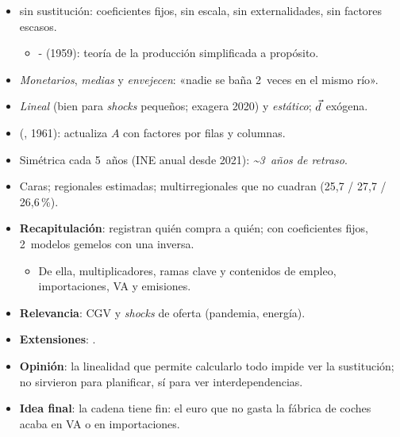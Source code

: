 \documentclass{article}
\begin{document}
\begin{columnas}
\begin{itemize}
\item {} sin sustitución: coeficientes fijos, sin escala, sin externalidades, sin factores escasos.
  \begin{itemize}
  \item {}- (1959): teoría de la producción simplificada a propósito.
  \end{itemize}
\end{itemize}
\begin{itemize}
\item \emph{Monetarios}, \emph{medias} y \emph{envejecen}: «nadie se baña 2~veces en el mismo río».
\item \emph{Lineal} (bien para \emph{shocks} pequeños; exagera 2020) y \emph{estático}; $\vec{d}$ exógena.
\item {} (, 1961): actualiza $A$ con factores por filas y columnas.
\end{itemize}
\begin{itemize}
\item Simétrica cada 5~años (INE anual desde 2021): \emph{\textasciitilde 3~años de retraso}.
\item Caras; regionales estimadas; multirregionales que no cuadran (25,7 / 27,7 / 26,6\,\%).
\end{itemize}

\begin{itemize}
\item \textbf{Recapitulación}: registran quién compra a quién; con coeficientes fijos, 2~modelos gemelos con una inversa.
  \begin{itemize}
  \item De ella, multiplicadores, ramas clave y contenidos de empleo, importaciones, VA y emisiones.
  \end{itemize}
\item \textbf{Relevancia}: CGV y \emph{shocks} de oferta (pandemia, energía).
\item \textbf{Extensiones}:      .
\item \textbf{Opinión}: la linealidad que permite calcularlo todo impide ver la sustitución; no sirvieron para planificar, sí para ver interdependencias.
\item \textbf{Idea final}: la cadena tiene fin: el euro que no gasta la fábrica de coches acaba en VA o en importaciones.
\end{itemize}


\end{columnas}
\end{document}
